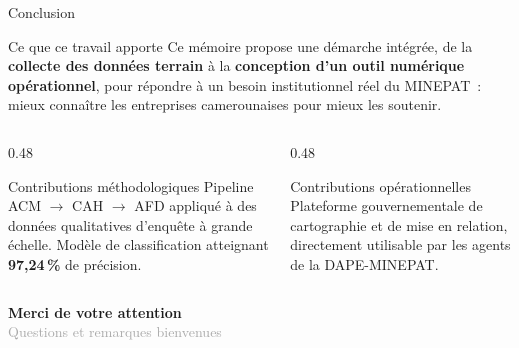 \documentclass[aspectratio=169, 10pt]{beamer}
\begin{document}
\begin{frame}{Conclusion}
    \begin{block}{Ce que ce travail apporte}
        Ce mémoire propose une démarche intégrée, de la
        \textbf{collecte des données terrain} à la
        \textbf{conception d'un outil numérique opérationnel},
        pour répondre à un besoin institutionnel réel du MINEPAT~:
        mieux connaître les entreprises camerounaises pour
        mieux les soutenir.
    \end{block}
    \vspace{10pt}
    \begin{columns}[T]
        \begin{column}{0.48\textwidth}
            \begin{exampleblock}{Contributions méthodologiques}
                Pipeline ACM $\to$ CAH $\to$ AFD appliqué à des
                données qualitatives d'enquête à grande échelle.
                Modèle de classification atteignant
                \textbf{97,24\,\%} de précision.
            \end{exampleblock}
        \end{column}
        \begin{column}{0.48\textwidth}
            \begin{exampleblock}{Contributions opérationnelles}
                Plateforme gouvernementale de cartographie
                et de mise en relation, directement utilisable
                par les agents de la DAPE-MINEPAT.
            \end{exampleblock}
        \end{column}
    \end{columns}
    \vspace{12pt}
    \centering
    \Large\textcolor{primary}{\textbf{Merci de votre attention}}\\[6pt]
    \normalsize\textcolor{darkgray}{Questions et remarques bienvenues}
\end{frame}
\end{document}
